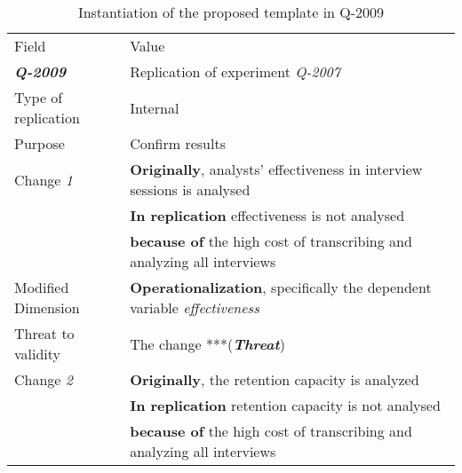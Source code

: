 \begin{table*}[h]
  \caption{Instantiation of the proposed template in Q-2009}
\label{tab:plantEng}
  \centering

\begin{tabularx}{\textwidth}{
  >{\hsize=0.3\hsize}X
  >{\hsize=0.8\hsize}X}
  
    \noalign{\smallskip}\hline\noalign{\smallskip}
  
  Field &  Value  \\ 
  \noalign{\smallskip}\hline\noalign{\smallskip}
  
\textbf {\textit{Q-2009}} &  Replication of experiment \textit{Q-2007 }    \\
Type of replication &  Internal   \\ 
Purpose  &  Confirm results  \\   
\hline 

    Change \textit{1}   & \textbf{Originally}, analysts' effectiveness in interview sessions is analysed \\& \textbf{In replication} effectiveness is not analysed  \\ & \textbf{because of} the high cost of transcribing and analyzing all interviews \\
    
    Modified Dimension & 
    \textbf{Operationalization}, specifically the dependent variable  \textit {effectiveness} \\   
    Threat to validity & The change ***(\textbf{\textit{Threat}})
    \\
    \hline

    Change \textit{2}   & \textbf{Originally}, the retention capacity is analyzed \\& \textbf{In replication} retention capacity is not analysed  \\& \textbf{because of} the high cost of transcribing and analyzing all interviews  \\  


\end{tabularx}
\end{table*}
